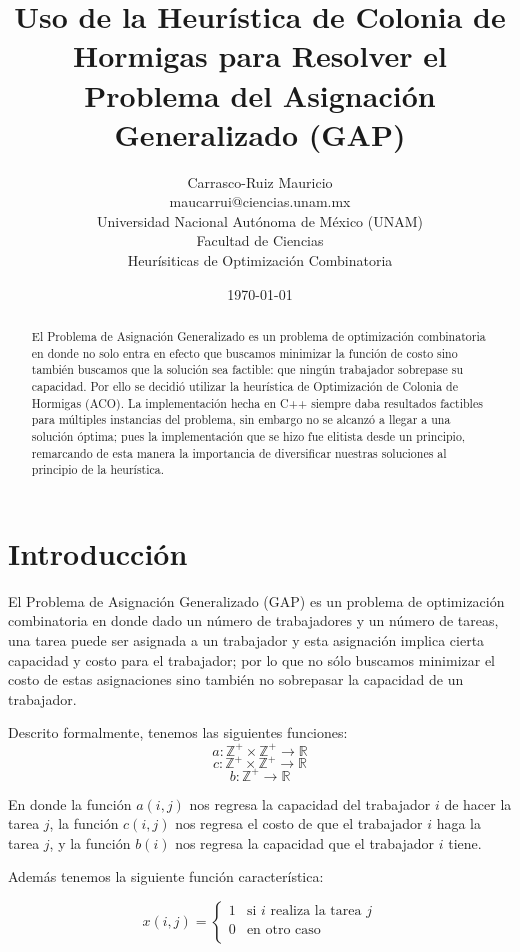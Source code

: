 \documentclass{article}
\title{Uso de la Heurística de Colonia de Hormigas para Resolver
       el Problema del Asignación Generalizado (GAP)}
\author{Carrasco-Ruiz Mauricio  \\
	maucarrui@ciencias.unam.mx  \\
        Universidad Nacional Autónoma de México (UNAM) \\
        Facultad de Ciencias \\
        Heurísiticas de Optimización Combinatoria \\
	}
\date{\today}
\begin{document}
    \maketitle

    \begin{abstract}
      El Problema de Asignación Generalizado es 
      un problema de optimización combinatoria en donde 
      no solo entra en efecto que buscamos minimizar 
      la función de costo sino también buscamos 
      que la solución sea factible: que ningún trabajador
      sobrepase su capacidad. Por ello se decidió utilizar
      la heurística de Optimización de Colonia de Hormigas
      (ACO). La implementación hecha en C++ siempre daba 
      resultados factibles para múltiples instancias del 
      problema, sin embargo no se alcanzó a llegar a una 
      solución óptima; pues la implementación que se hizo
      fue elitista desde un principio, remarcando de esta 
      manera la importancia de diversificar nuestras 
      soluciones al principio de la heurística.
    \end{abstract}

    \section{Introducción} \label{intro}
    El Problema de Asignación Generalizado (GAP) es un 
    problema de optimización combinatoria en donde dado un 
    número de trabajadores y un número de tareas, una 
    tarea puede ser asignada a un trabajador y esta 
    asignación implica cierta capacidad y costo para el 
    trabajador; por lo que no sólo buscamos minimizar el 
    costo de estas asignaciones sino también no sobrepasar 
    la capacidad de un trabajador.

    Descrito formalmente, tenemos las siguientes funciones: 
    \[ a: \mathbb{Z}^+ \times \mathbb{Z}^+ \rightarrow \mathbb{R} \]
    \[ c: \mathbb{Z}^+ \times \mathbb{Z}^+ \rightarrow \mathbb{R} \]
    \[ b: \mathbb{Z}^+ \rightarrow \mathbb{R} \]

    En donde la función $a(i, j)$ nos regresa la capacidad del 
    trabajador $i$ de hacer la tarea $j$, la función $c(i, j)$
    nos regresa el costo de que el trabajador $i$ haga la tarea
    $j$, y la función $b(i)$ nos regresa la capacidad que el 
    trabajador $i$ tiene.

    Además tenemos la siguiente función característica:
    
    \[ x(i, j) = 
         \begin{cases}
           1 & \text{si } i \text{ realiza la tarea } j \\
           0 & \text{en otro caso} \\
         \end{cases}
    \]
    
\end{document}
